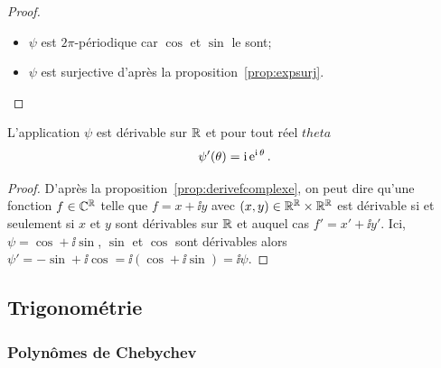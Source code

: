                     \begin{proof}
                      \begin{itemize}
                        \item \(\psi\) est \(2\pi\)-périodique car \(\cos\) et \(\sin\) le sont;
                        \item \(\psi\) est surjective d'après la proposition~\ref{prop:expsurj}.
                      \end{itemize}
                    \end{proof}

                    \begin{prop}
                      L'application \(\psi\) est dérivable sur \(\mathbb{R}\) et pour tout réel \(theta\) 
                      \[\psi'(\theta) = \operatorname{i} \operatorname{e}^{\operatorname{i} \theta}.\]
                    \end{prop}

                    \begin{proof}
                      D'après la proposition~\ref{prop:derivefcomplexe}, on peut dire qu'une 
                      fonction \(f \in \mathbb{C}^{\mathbb{R}}\) telle que \(f = x + \ii y\) avec \((x, y) \in 
                      \mathbb{R}^{\mathbb{R}} \times \mathbb{R}^{\mathbb{R}}\) est dérivable si et seulement si \(x\) et \(y\) 
                      sont dérivables sur \(\mathbb{R}\) et auquel cas \(f' = x'  + \ii y'\). Ici, \(\psi 
                      = \cos  + \ii \sin\), \(\sin\) et \(\cos\) sont dérivables alors \(\psi' = 
                      -\sin + \ii \cos = \ii (\cos  + \ii \sin) = \ii \psi\).
                    \end{proof}

                    \subsection{Trigonométrie}
                    \label{subsec:complexestrigo}

                    \subsubsection{Polynômes de Chebychev}
                    \label{subsubsec:Chebychev}

